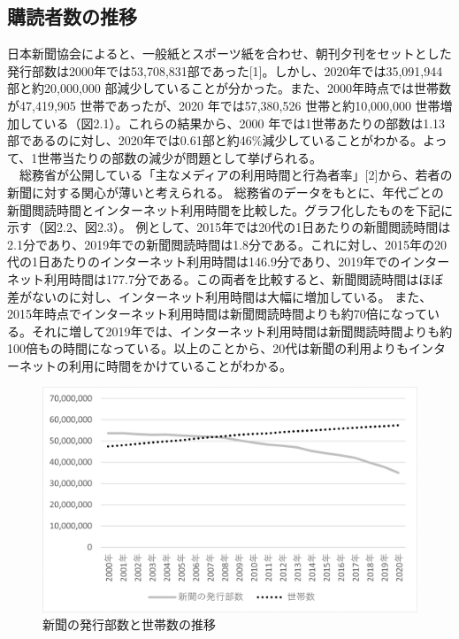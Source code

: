 \subsection{購読者数の推移}
日本新聞協会によると、一般紙とスポーツ紙を合わせ、朝刊夕刊をセットとした発行部数は2000年では53,708,831部であった[1]。しかし、2020年では35,091,944 部と約20,000,000 部減少していることが分かった。また、2000年時点では世帯数が47,419,905 世帯であったが、2020 年では57,380,526 世帯と約10,000,000 世帯増加している（図2.1）。これらの結果から、2000 年では1世帯あたりの部数は1.13部であるのに対し、2020年では0.61部と約46\%減少していることがわかる。よって、1世帯当たりの部数の減少が問題として挙げられる。\\
　総務省が公開している「主なメディアの利用時間と行為者率」[2]から、若者の新聞に対する関心が薄いと考えられる。
総務省のデータをもとに、年代ごとの新聞閲読時間とインターネット利用時間を比較した。グラフ化したものを下記に示す（図2.2、図2.3）。
例として、2015年では20代の1日あたりの新聞閲読時間は2.1分であり、2019年での新聞閲読時間は1.8分である。これに対し、2015年の20代の1日あたりのインターネット利用時間は146.9分であり、2019年でのインターネット利用時間は177.7分である。この両者を比較すると、新聞閲読時間はほぼ差がないのに対し、インターネット利用時間は大幅に増加している。
また、2015年時点でインターネット利用時間は新聞閲読時間よりも約70倍になっている。それに増して2019年では、インターネット利用時間は新聞閲読時間よりも約100倍もの時間になっている。以上のことから、20代は新聞の利用よりもインターネットの利用に時間をかけていることがわかる。
\newpage
\begin{figure}[htbp]
    \centering
    \includegraphics[keepaspectratio, scale=0.5]{images/newspaper4.png}
    \caption{新聞の発行部数と世帯数の推移}
    \label{fig:my_label}
\end{figure}

